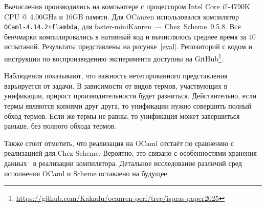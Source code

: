 Вычисления производились на компьютере с процессором Intel Core i7-4790K CPU @ 4.00GHz и 16GB памяти.
Для OCanren использовался компилятор \texttt{OCaml-4.14.2+flambda}, для faster-miniKanren~--- Chez~Scheme~9.5.8.
Все бенчмарки компилировались в нативный код и вычислялось среднее время за 40 испытаний.
Результаты представлены на рисунке~\ref{eval}.
Репозиторий с кодом и инструкции по воспроизведению эксперимента доступны на GitHub\footnote{\url{https://github.com/Kakadu/ocanren-perf/tree/ispras-paper2025}}.

Наблюдения показывают, что важность нетегированного представления варьируется от задачи.
В зависимости от видов термов, участвующих в унификации, прирост производительности будет разниться.
Действительно, если термы являются копиями друг друга, то унификации нужно совершить полный обход термов. Если же термы не равны, то унификация может завершиться раньше, без полного обхода термов.

Также стоит отметить, что реализация на OCaml отстаёт по сравнению с реализацией для Chez Scheme. Вероятно, это связано с особенностями хранения данных~\cite{BIBOP94} в реализации компилятора. Детальное исследование различий сред исполнения OCaml и Scheme оставлено на будущее.

